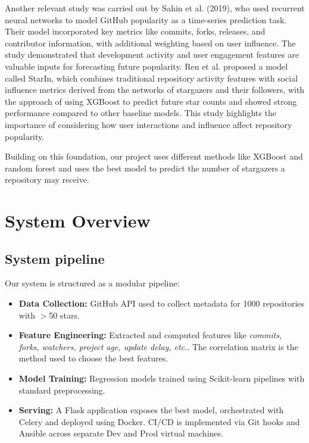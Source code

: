 \documentclass[12pt,a4paper]{article}
\begin{document}
Another relevant study was carried out by Sahin et al. (2019),\cite{4} who used recurrent neural networks to model GitHub popularity as a time-series prediction task. Their model incorporated key metrics like commits, forks, releases, and contributor information, with additional weighting based on user influence. The study demonstrated that development activity and user engagement features are valuable inputs for forecasting future popularity. Ren et al.\cite{2} proposed a model called StarIn, which combines traditional repository activity features with social influence metrics derived from the networks of stargazers and their followers, with the approach of using XGBoost to predict future star counts and showed strong performance compared to other baseline models. This study highlights the importance of considering how user interactions and influence affect repository popularity.

Building on this foundation, our project uses different methods like XGBoost and random forest and uses the best model to predict the number of stargazers a repository may receive. 

\section{System Overview}
\subsection{System pipeline}
Our system is structured as a modular pipeline:
\begin{itemize}
    \item \textbf{Data Collection:} GitHub API used to collect metadata for 1000 repositories with $>$50 stars.
    \item \textbf{Feature Engineering:} Extracted and computed features like \textit{commits, forks, watchers, project age, update delay, etc.}. The correlation matrix is the method used to choose the best features.
    \item \textbf{Model Training:} Regression models trained using Scikit-learn pipelines with standard preprocessing.
    \item \textbf{Serving:} A Flask application exposes the best model, orchestrated with Celery and deployed using Docker. CI/CD is implemented via Git hooks and Ansible across separate Dev and Prod virtual machines.
\end{itemize}
\end{document}
